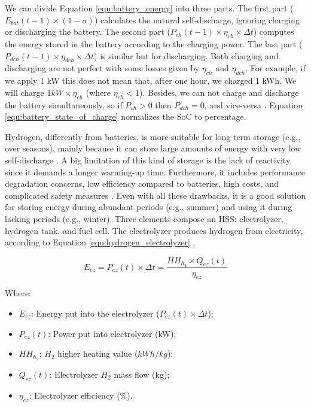 We can divide Equation \ref{equ:battery_energy} into three parts. The first part ($E_{bat}(t-1) \times (1 - \sigma)$) calculates the natural self-discharge, ignoring charging or discharging the battery. The second part ($P_{ch}(t-1) \times \eta_{ch} \times \Delta t$) computes the energy stored in the battery according to the charging power. The last part ($P_{dch}(t-1) \times \eta_{dch} \times \Delta t$) is similar but for discharging. Both charging and discharging are not perfect with some losses given by $\eta_{ch}$ and $\eta_{dch}$. For example, if we apply 1 kW this does not mean that, after one hour, we charged 1 kWh. We will charge $1 kW \times \eta_{ch}$ (where $\eta_{ch} < 1$). Besides, we can not charge and discharge the battery simultaneously, so if $P_{ch} > 0$ then $P_{dch} = 0$, and vice-versa \cite{haddad2019mixed}. Equation \ref{equ:battery_state_of_charge} normalizes the SoC to percentage.

Hydrogen, differently from batteries, is more suitable for long-term storage (e.g., over seasons), mainly because it can store large amounts of energy with very low self-discharge \cite{pregger2009prospects}. A big limitation of this kind of storage is the lack of reactivity since it demands a longer warming-up time. Furthermore, it includes performance degradation concerns, low efficiency compared to batteries, high costs, and complicated safety measures \cite{rostirolla2022survey}. Even with all these drawbacks, it is a good solution for storing energy during abundant periods (e.g., summer) and using it during lacking periods (e.g., winter). Three elements compose an HSS: electrolyzer, hydrogen tank, and fuel cell. The electrolyzer produces hydrogen from electricity, according to Equation \ref{equ:hydrogen_electrolyzer} \cite{haddad2019mixed}.

\begin{equation}
    \label{equ:hydrogen_electrolyzer}
    E_{ez} = P_{ez}(t) \times \Delta t = \frac{HH_{h_{2}} \times Q_{ez}(t)}{\eta_{ez}}
\end{equation}

Where:
\begin{itemize}
    \item $E_{ez}$: Energy put into the electrolyzer ($P_{ez}(t) \times \Delta t$);
    \item $P_{ez}(t)$: Power put into electrolyzer (kW);
    \item $HH_{h_{2}}$: $H_2$ higher heating value ($kWh / kg$);
    \item $Q_{ez}(t)$: Electrolyzer $H_2$ mass flow (kg);
    \item $\eta_{ez}$: Electrolyzer efficiency (\%).
\end{itemize}

